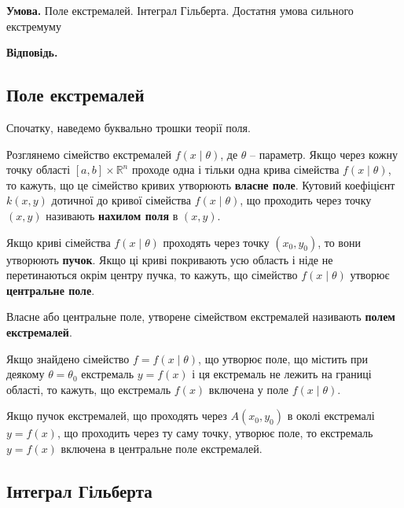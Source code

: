 \documentclass[14pt]{extarticle}
\newcommand{\<}{\langle}
\renewcommand{\>}{\rangle}
\theoremstyle{mystyle}{\newtheorem{definition}{Definition}[section]}
\theoremstyle{mystyle}{\newtheorem{proposition}[definition]{Proposition}}
\theoremstyle{mystyle}{\newtheorem{theorem}[definition]{Theorem}}
\theoremstyle{mystyle}{\newtheorem{lemma}[definition]{Lemma}}
\theoremstyle{mystyle}{\newtheorem{corollary}[definition]{Corollary}}
\theoremstyle{mystyle}{\newtheorem*{remark}{Remark}}
\theoremstyle{mystyle}{\newtheorem*{remarks}{Remarks}}
\theoremstyle{mystyle}{\newtheorem*{example}{Example}}
\theoremstyle{mystyle}{\newtheorem*{examples}{Examples}}
\theoremstyle{definition}{\newtheorem*{exercise}{Exercise}}
\theoremstyle{cstyle}{\newtheorem*{cthm}{}}
\theoremstyle{warn}
\begin{document}
\textbf{Умова.} Поле екстремалей. Інтеграл Гільберта. Достатня умова сильного екстремуму

\textbf{Відповідь.}

\subsection{Поле екстремалей}

Спочатку, наведемо буквально трошки теорії поля.

\begin{definition}
    Розглянемо сімейство екстремалей $f(x\mid\theta)$, де $\theta$ -- параметр. Якщо через кожну точку області $[a,b]\times \mathbb{R}^n$ проходе одна і тільки одна крива 
    сімейства $f(x \mid \theta)$, то кажуть, що це сімейство кривих утворюють \textbf{власне поле}. Кутовий коефіцієнт $k(x,y)$ дотичної 
    до кривої сімейства $f(x \mid \theta)$, що проходить через точку $(x,y)$ називають \textbf{нахилом поля} в $(x,y)$.
\end{definition}

\begin{definition}
    Якщо криві сімейства $f(x \mid \theta)$ проходять через точку $(x_0,y_0)$, то вони утворюють \textbf{пучок}. Якщо ці криві покривають 
    усю область і ніде не перетинаються окрім центру пучка, то кажуть, що сімейство $f(x \mid \theta)$ утворює \textbf{центральне поле}.
\end{definition}

\begin{definition}
    Власне або центральне поле, утворене сімейством екстремалей називають \textbf{полем екстремалей}.
\end{definition}

\begin{definition}
    Якщо знайдено сімейство $f=f(x\mid\theta)$, що утворює поле, що містить при деякому $\theta=\theta_0$ екстремаль $y=f(x)$ і ця екстремаль
    не лежить на границі області, то кажуть, що екстремаль $f(x)$ включена у поле $f(x \mid \theta)$.
\end{definition}

\begin{definition}
    Якщо пучок екстремалей, що проходять через $A(x_0,y_0)$ в околі екстремалі $y=f(x)$, що проходить через ту саму точку, утворює поле, то екстремаль $y=f(x)$ включена в центральне поле екстремалей.
\end{definition}

\subsection{Інтеграл Гільберта}
\end{document}
